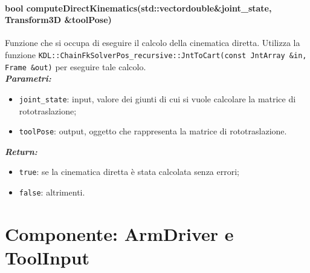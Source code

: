 \paragraph{bool computeDirectKinematics(std::vector\tl double\tr \&joint\_state, Transform3D \&toolPose)}

Funzione che si occupa di eseguire il calcolo della cinematica diretta. Utilizza la funzione \texttt{KDL::ChainFkSolverPos\_recursive::JntToCart(const JntArray \&in, Frame \&out)} per eseguire tale calcolo.  \\
\textbf{\textit{Parametri:}}
\begin{itemize}
	\item \texttt{joint\_state}: input, valore dei giunti di cui si vuole calcolare la matrice di rototraslazione; 
	\item \texttt{toolPose}: output, oggetto che rappresenta la matrice di rototraslazione.
\end{itemize}
\textbf{\textit{Return:}}
\begin{itemize}
	\item \texttt{true}: se la cinematica diretta è stata calcolata senza errori;
	\item \texttt{false}: altrimenti.
\end{itemize}


\section{Componente: ArmDriver e ToolInput}
